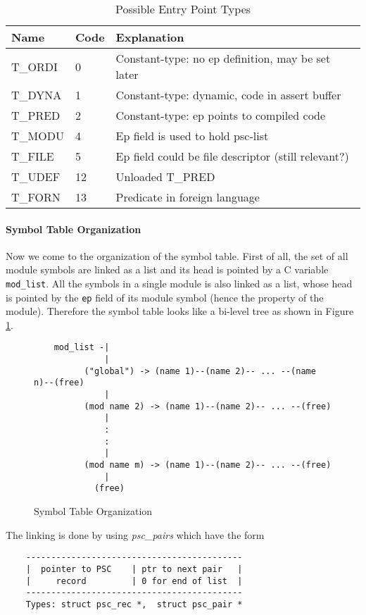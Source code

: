 \documentclass[11pt]{article}
\begin{document}
\begin{table}\centering
\begin{tabular}{l|l|l}
\hline
Name & Code	& Explanation				\\
\hline

T\_ORDI  & 0	& Constant-type: no ep definition, may be set later  \\
T\_DYNA	& 1	& Constant-type: dynamic, code in assert buffer  \\
T\_PRED  & 2	& Constant-type: ep points to compiled code  \\
T\_MODU  & 4	& Ep field is used to hold psc-list  \\
T\_FILE  & 5	& Ep field could be file descriptor (still relevant?)  \\
T\_UDEF & 12	& Unloaded T\_PRED  \\
T\_FORN & 13	& Predicate in foreign language  \\
\hline
\end{tabular}
\caption{Possible Entry Point Types}
\label{t:ep}
\end{table}
%


\paragraph*{Symbol Table Organization}
Now we come to the organization of the symbol table.  First of all,
the set of all module symbols are linked as a list and its head is
pointed by a C variable {\tt mod\_list}. All the symbols in a single
module is also linked as a list, whose head is pointed by the {\tt ep}
field of its module symbol (hence the property of the module).
Therefore the symbol table looks like a bi-level tree as shown in
Figure \ref{f:pscinmem}.

\begin{figure}
\begin{verbatim}
    mod_list -|
              |
          ("global") -> (name 1)--(name 2)-- ... --(name n)--(free)
              |
          (mod name 2) -> (name 1)--(name 2)-- ... --(free)
              |
              :
              :
              |
          (mod name m) -> (name 1)--(name 2)-- ... --(free)
              |
            (free)
\end{verbatim}
\caption{Symbol Table Organization}
\label{f:pscinmem}
\end{figure}

The linking is done by using {\it psc\_pairs} which have the form

\begin{verbatim}
    -------------------------------------------
    |  pointer to PSC    | ptr to next pair   |
    |     record         | 0 for end of list  |
    -------------------------------------------
    Types: struct psc_rec *,  struct psc_pair *
\end{verbatim}
\end{document}
